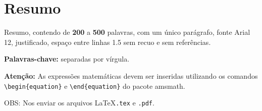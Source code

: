 \documentclass{sm}
\begin{document}
	\mostratitulo
	\mostradados															%
	
	\section{Resumo}
	
	Resumo, contendo de \textbf{200} a \textbf{500} palavras, com um único 
	parágrafo, fonte Arial 12, justificado, espaço entre linhas 1.5 sem recuo e 
	sem referências.
	
	\textbf{Palavras-chave:} separadas por vírgula.

	\vspace{\baselineskip}

	\textbf{Atenção:} As expressões matemáticas devem ser inseridas utilizando 
	os comandos\\ \verb!\begin{equation}! e \verb!\end{equation}! do pacote amsmath.

	\vspace{\baselineskip}

	OBS: Nos enviar os arquivos \LaTeX \texttt{.tex} e \texttt{.pdf}.
	
\end{document}
